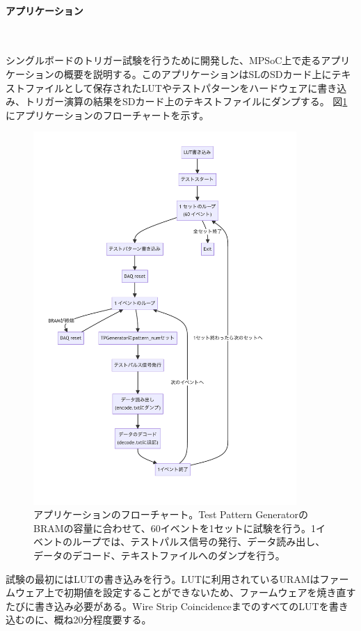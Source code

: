 \paragraph{アプリケーション}　　
\par
シングルボードのトリガー試験を行うために開発した、MPSoC上で走るアプリケーションの概要を説明する。このアプリケーションはSLのSDカード上にテキストファイルとして保存されたLUTやテストパターンをハードウェアに書き込み、トリガー演算の結果をSDカード上のテキストファイルにダンプする。
図\ref{Flowchart}にアプリケーションのフローチャートを示す。

\begin{figure} 
\centering
\includegraphics[width=10cm]{fig/Test/Flowchart.pdf}
\caption[アプケーションのフローチャート]{アプリケーションのフローチャート。Test Pattern GeneratorのBRAMの容量に合わせて、60イベントを1セットに試験を行う。1イベントのループでは、テストパルス信号の発行、データ読み出し、データのデコード、テキストファイルへのダンプを行う。}
\label{Flowchart}
\end{figure}

試験の最初にはLUTの書き込みを行う。LUTに利用されているURAMはファームウェア上で初期値を設定することができないため、ファームウェアを焼き直すたびに書き込み必要がある。Wire Strip CoincidenceまでのすべてのLUTを書き込むのに、概ね20分程度要する。

